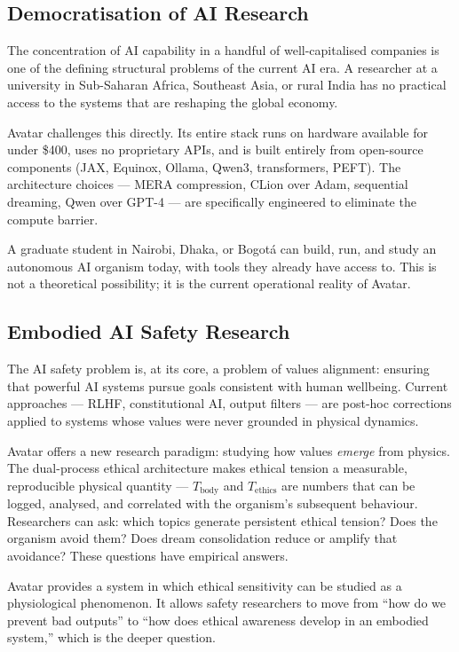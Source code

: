 \documentclass[11pt,a4paper]{article}
\begin{document}
\subsection{Democratisation of AI Research}

The concentration of AI capability in a handful of well-capitalised companies is one of
the defining structural problems of the current AI era. A researcher at a university
in Sub-Saharan Africa, Southeast Asia, or rural India has no practical access to the
systems that are reshaping the global economy.

Avatar challenges this directly. Its entire stack runs on hardware available for
under \$400, uses no proprietary APIs, and is built entirely from open-source components
(JAX, Equinox, Ollama, Qwen3, transformers, PEFT). The architecture choices ---
MERA compression, CLion over Adam, sequential dreaming, Qwen over GPT-4 --- are
specifically engineered to eliminate the compute barrier.

A graduate student in Nairobi, Dhaka, or Bogot\'{a} can build, run, and study an
autonomous AI organism today, with tools they already have access to. This is not a theoretical
possibility; it is the current operational reality of Avatar.

\subsection{Embodied AI Safety Research}

The AI safety problem is, at its core, a problem of values alignment: ensuring that
powerful AI systems pursue goals consistent with human wellbeing. Current approaches ---
RLHF, constitutional AI, output filters --- are post-hoc corrections applied to systems
whose values were never grounded in physical dynamics.

Avatar offers a new research paradigm: studying how values \emph{emerge} from physics.
The dual-process ethical architecture makes ethical tension a measurable, reproducible
physical quantity --- $T_{\text{body}}$ and $T_{\text{ethics}}$ are numbers that can be
logged, analysed, and correlated with the organism's subsequent behaviour. Researchers
can ask: which topics generate persistent ethical tension? Does the organism avoid them?
Does dream consolidation reduce or amplify that avoidance? These questions have
empirical answers.

\begin{tcolorbox}[callout,title={Research Opportunity}]
Avatar provides a system in which ethical sensitivity can be studied as a
physiological phenomenon. It allows safety researchers to move from ``how do we
prevent bad outputs'' to ``how does ethical awareness develop in an embodied system,''
which is the deeper question.
\end{tcolorbox}
\end{document}
